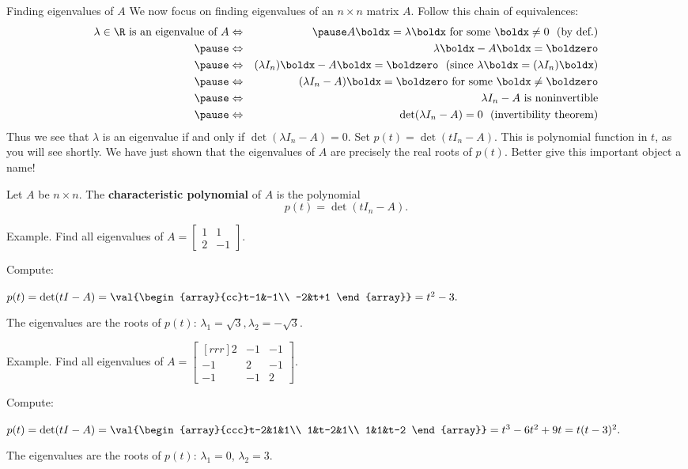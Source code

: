 \begin{frame}{Finding eigenvalues of $A$}
\footnotesize
We now focus on finding eigenvalues of an $n\times n$ matrix $A$. Follow this chain of equivalences:
\begin{eqnarray*}
\text{$\lambda\in\R$ is an eigenvalue of $A$}&\Leftrightarrow&
\pause A\boldx=\lambda\boldx \text{ for some $\boldx\ne 0$}
\ \text{ (by def.)}\\
\pause&\Leftrightarrow&\lambda\boldx-A\boldx=\boldzero\\
\pause&\Leftrightarrow&(\lambda I_n)\boldx-A\boldx=\boldzero \ \text{ (since $\lambda\boldx=(\lambda I_n)\boldx$)}\\
\pause&\Leftrightarrow&(\lambda I_n-A)\boldx=\boldzero \text{ for some $\boldx\ne \boldzero$}\\
\pause&\Leftrightarrow&\lambda I_n-A \text{ is noninvertible}\\
\pause&\Leftrightarrow&\det(\lambda I_n-A)=0 \ \text{ (invertibility theorem)}
\end{eqnarray*}
\pause 
Thus we see that $\lambda$ is an eigenvalue if and only if $\det(\lambda I_n-A)=0$. 
\bpause 
Set $p(t)=\det(tI_n-A)$. This is polynomial function in $t$, as you will see shortly. We have just shown that the eigenvalues of $A$ are precisely the \alert{real roots} of $p(t)$. Better give this important object a name!
\pause
\begin{definition}
Let $A$ be $n\times n$. The {\bf characteristic polynomial} of $A$ is the polynomial 
\[
p(t)=\det(tI_n-A).
\]
\end{definition}
\end{frame}
\begin{frame}
\alert{Example}. Find all eigenvalues of $A=\begin{bmatrix}
1&1\\
2&-1
\end{bmatrix}$. 
\begin{bsolution}
Compute:

$
p(t)=\det(tI-A)=\val{\begin{array}{cc}t-1&-1\\ -2&t+1 \end{array}}=t^2-3.
$

\pause The eigenvalues are the roots of $p(t)$: $
\lambda_1=\sqrt{3}, \lambda_2=-\sqrt{3}$.
\end{bsolution}

\pause
\alert{Example}. Find all eigenvalues of $A=\begin{bmatrix}[rrr]
2&-1&-1\\
-1&2&-1\\
-1&-1&2
\end{bmatrix}$.
\begin{bsolution}
Compute:

$
p(t)=\det(tI-A)=\val{\begin{array}{ccc}t-2&1&1\\ 1&t-2&1\\ 1&1&t-2 \end{array}}=t^3-6t^2+9t=t(t-3)^2.
$

\pause The eigenvalues are the roots of $p(t)$: $\lambda_1=0$, $\lambda_2=3$.
\end{bsolution}
\end{frame}
